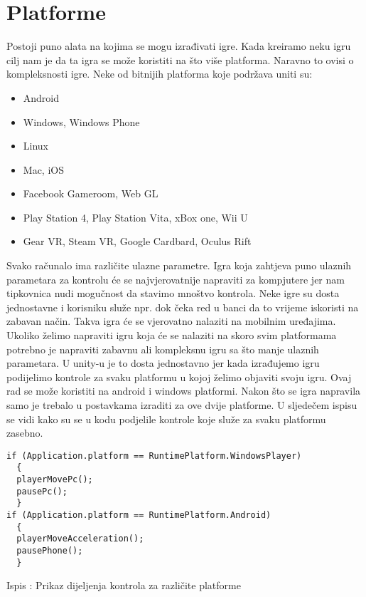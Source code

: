 \section{Platforme}
Postoji puno alata na kojima se mogu izrađivati igre. Kada kreiramo neku igru cilj nam je da ta igra se može koristiti na što više platforma. Naravno to ovisi o kompleksnosti igre. Neke od bitnijih platforma koje podržava uniti su:
\begin{itemize}
\item Android
\item Windows, Windows Phone
\item Linux
\item Mac, iOS
\item Facebook Gameroom, Web GL
\item Play Station 4, Play Station Vita, xBox one, Wii U
\item Gear VR, Steam VR, Google Cardbard, Oculus Rift 
\end{itemize}

Svako računalo ima različite ulazne parametre. Igra koja zahtjeva puno ulaznih parametara za kontrolu će se najvjerovatnije napraviti za kompjutere jer nam tipkovnica nudi mogučnost da stavimo mnoštvo kontrola. Neke igre su dosta jednostavne i korisniku služe npr. dok čeka red u banci da to vrijeme iskoristi na zabavan način. Takva igra će se vjerovatno nalaziti na mobilnim uređajima. Ukoliko želimo napraviti igru koja će se nalaziti na skoro svim platformama potrebno je napraviti zabavnu ali kompleksnu igru sa što manje ulaznih parametara. U unity-u je to dosta jednostavno jer kada izrađujemo igru podijelimo kontrole za svaku platformu u kojoj želimo objaviti svoju igru. Ovaj rad se može koristiti na android i windows platformi. Nakon što se igra napravila samo je trebalo u postavkama izraditi za ove dvije platforme. U sljedečem ispisu se vidi kako su se u kodu podjelile kontrole koje služe za svaku platformu zasebno.

\begin{verbatim}
if (Application.platform == RuntimePlatform.WindowsPlayer)
  {
  playerMovePc();
  pausePc();
  }
if (Application.platform == RuntimePlatform.Android)
  {
  playerMoveAcceleration();
  pausePhone();
  }

\end{verbatim}
\begin{center}
	
	Ispis : Prikaz dijeljenja kontrola za različite platforme
\end{center}
